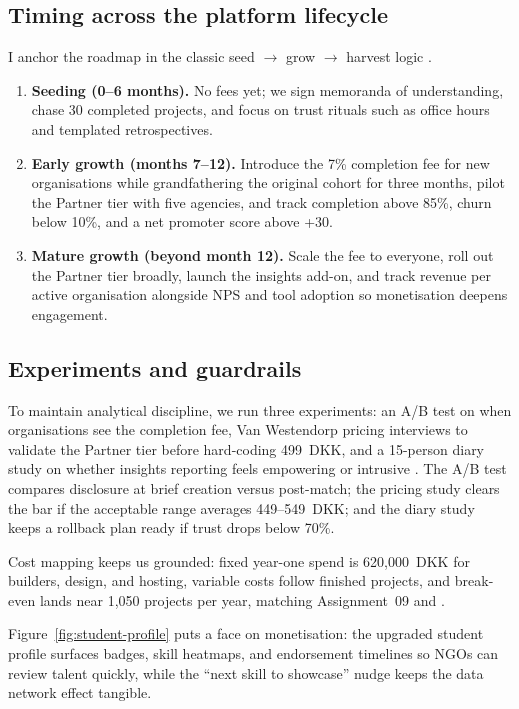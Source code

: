 \subsection*{Timing across the platform lifecycle}
I anchor the roadmap in the classic seed $\rightarrow$ grow $\rightarrow$ harvest logic \citep{Choudary2016}.
\begin{enumerate}
  \item \textbf{Seeding (0--6 months).} No fees yet; we sign memoranda of understanding, chase 30 completed projects, and focus on trust rituals such as office hours and templated retrospectives.
  \item \textbf{Early growth (months 7--12).} Introduce the 7\% completion fee for new organisations while grandfathering the original cohort for three months, pilot the Partner tier with five agencies, and track completion above 85\%, churn below 10\%, and a net promoter score above +30.
  \item \textbf{Mature growth (beyond month 12).} Scale the fee to everyone, roll out the Partner tier broadly, launch the insights add-on, and track revenue per active organisation alongside NPS and tool adoption so monetisation deepens engagement.
\end{enumerate}

\subsection*{Experiments and guardrails}
To maintain analytical discipline, we run three experiments: an A/B test on when organisations see the completion fee, Van Westendorp pricing interviews to validate the Partner tier before hard-coding 499~DKK, and a 15-person diary study on whether insights reporting feels empowering or intrusive \citep{Reillier2017}. The A/B test compares disclosure at brief creation versus post-match; the pricing study clears the bar if the acceptable range averages 449--549~DKK; and the diary study keeps a rollback plan ready if trust drops below 70\%.

Cost mapping keeps us grounded: fixed year-one spend is 620,000~DKK for builders, design, and hosting, variable costs follow finished projects, and break-even lands near 1,050 projects per year, matching Assignment~09 and \citet{ShapiroVarian1999}.

Figure~\ref{fig:student-profile} puts a face on monetisation: the upgraded student profile surfaces badges, skill heatmaps, and endorsement timelines so NGOs can review talent quickly, while the ``next skill to showcase'' nudge keeps the data network effect tangible.

